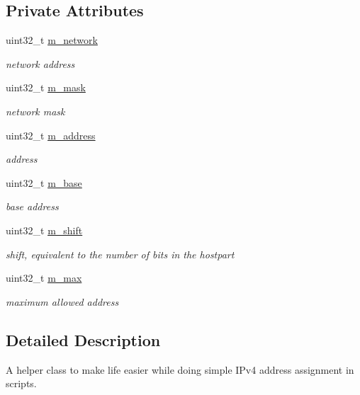 \subsection*{Private Attributes}
\begin{DoxyCompactItemize}
\item 
uint32\+\_\+t \hyperlink{classns3_1_1Ipv4AddressHelper_a33cf40b39d8e89b8ed3db1545371a147}{m\+\_\+network}
\begin{DoxyCompactList}\small\item\em network address \end{DoxyCompactList}\item 
uint32\+\_\+t \hyperlink{classns3_1_1Ipv4AddressHelper_a1609535faf34e2010483660d881fe29e}{m\+\_\+mask}
\begin{DoxyCompactList}\small\item\em network mask \end{DoxyCompactList}\item 
uint32\+\_\+t \hyperlink{classns3_1_1Ipv4AddressHelper_aa68736c00c771186f9bc5add68c791b1}{m\+\_\+address}
\begin{DoxyCompactList}\small\item\em address \end{DoxyCompactList}\item 
uint32\+\_\+t \hyperlink{classns3_1_1Ipv4AddressHelper_a6cc73c3a86586b6432114d1de1bcf485}{m\+\_\+base}
\begin{DoxyCompactList}\small\item\em base address \end{DoxyCompactList}\item 
uint32\+\_\+t \hyperlink{classns3_1_1Ipv4AddressHelper_a007ffce20667e8a2187e4fa023589a45}{m\+\_\+shift}
\begin{DoxyCompactList}\small\item\em shift, equivalent to the number of bits in the hostpart \end{DoxyCompactList}\item 
uint32\+\_\+t \hyperlink{classns3_1_1Ipv4AddressHelper_aa4a0386e78cf9fb6851ffeb47c4ae1db}{m\+\_\+max}
\begin{DoxyCompactList}\small\item\em maximum allowed address \end{DoxyCompactList}\end{DoxyCompactItemize}


\subsection{Detailed Description}
A helper class to make life easier while doing simple I\+Pv4 address assignment in scripts. 

